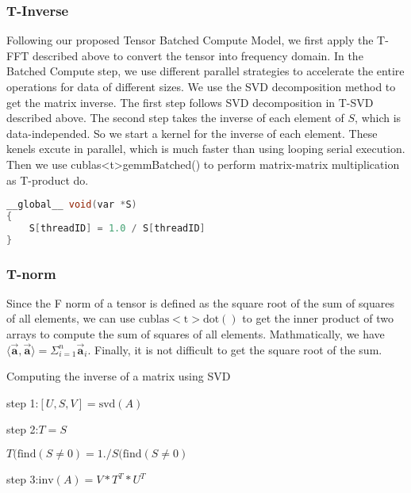 \documentclass[format=acmsmall, review=false, screen=true]{acmart}
\begin{document}
\subsubsection{T-Inverse}
Following our proposed Tensor Batched Compute Model, we first apply the T-FFT described above to convert the tensor into frequency domain. In the Batched Compute step, we use different parallel strategies to accelerate the entire operations for data of different sizes. We use the SVD decomposition method to get the matrix inverse. The first step follows SVD decomposition in T-SVD described above. The second step takes the inverse of each element of $S$, which is data-independed. So we start a kernel for the inverse of each element. These kenels excute in parallel, which is much faster than using looping serial execution.
Then we use \textup{cublas<t>gemmBatched()} to perform matrix-matrix multiplication as T-product do. 

\begin{lstlisting}[language=C]
__global__ void(var *S)
{
    S[threadID] = 1.0 / S[threadID]
}
\end{lstlisting}

\subsubsection{T-norm}
Since the F norm of a tensor is defined as the square root of the sum of squares of all elements, we can use $\mathrm{cublas<t>dot()}$ to get the inner product of two arrays to compute the sum of squares of all elements. Mathmatically, we have $\langle \vec{\mathbf{a}}, \vec{\mathbf{a}} \rangle = \Sigma^n_{i=1}\vec{\mathbf{a}}_i$. Finally, it is not difficult to get the square root of the sum.


\begin{algorithm}
\caption{Computing the inverse of a matrix using SVD}
\begin{algorithmic}
\STATE step 1:$[U, S, V] = \mathrm{svd}(A)$

\STATE step 2:$T =S$

\STATE $T(\mathrm{find}(S \neq 0) = 1./S(\mathrm{find}(S \neq 0)$

\STATE step 3:$\mathrm{inv}(A) = V \ast T^{T} \ast U^{T}$

\end{algorithmic}
\end{algorithm}
\end{document}
